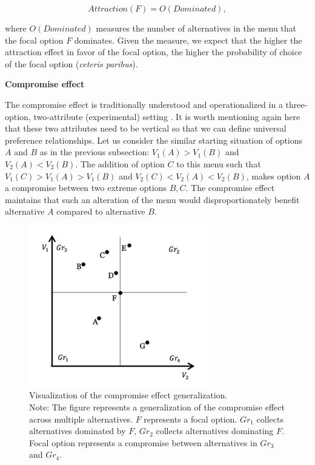 \documentclass[a4paper,12pt]{article}
\begin{document}
$$Attraction(F)=O(Dominated),$$

where $O(Dominated)$ measures the number of alternatives in the menu that the focal option $F$ dominates. Given the measure, we expect that the higher the attraction effect in favor of the focal option, the higher the probability of choice of the focal option (\textit{ceteris paribus}).

\textbf{Compromise effect}

The compromise effect is traditionally understood and operationalized in a three-option, two-attribute (experimental) setting \citep{simonson89, dharEtAl00}. It is worth mentioning again here that these two attributes need to be vertical so that we can define universal preference relationships. Let us consider the similar starting situation of options $A$ and $B$ as in the previous subsection: $V_1(A) > V_1(B)$ and $V_2(A) < V_2(B)$. The addition of option $C$ to this menu such that $V_1(C) > V_1(A) > V_1(B)$ and $V_2(C) < V_2(A) < V_2(B)$, makes option $A$ a compromise between two extreme options $B, C$. The compromise effect
maintains that such an alteration of the menu would disproportionately benefit alternative $A$ compared to alternative $B$.

\begin{figure}[t]
    \centering
    \includegraphics[width=0.7\textwidth]{staticFiles/compromiseEffectZaksScatterPlot.png}
    \caption[Compromise effect generalization]{Visualization of the compromise effect generalization.\\ Note: The figure represents a generalization of the compromise effect across multiple alternatives. $F$ represents a focal option. $Gr_1$ collects alternatives dominated by $F$, $Gr_2$ collects alternatives dominating $F$. Focal option represents a compromise between alternatives in $Gr_3$ and $Gr_4$.}
    \label{fig:compromiseZakVisualization}
\end{figure}
\end{document}
